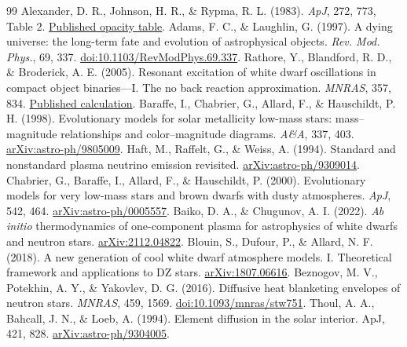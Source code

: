 \documentclass[11pt,letterpaper]{article}
\begin{document}
\begin{thebibliography}{99}
 Alexander, D. R., Johnson, H. R., \& Rypma, R. L. (1983).
\emph{ApJ}, 272, 773, Table 2.
\href{https://adsabs.harvard.edu/pdf/1983ApJ...272..773A}{Published opacity table}.
 Adams, F. C., \& Laughlin, G. (1997).
A dying universe: the long-term fate and evolution of astrophysical objects.
\emph{Rev. Mod. Phys.}, 69, 337.
\href{https://doi.org/10.1103/RevModPhys.69.337}{doi:10.1103/RevModPhys.69.337}.
 Rathore, Y., Blandford, R. D., \& Broderick, A. E. (2005).
Resonant excitation of white dwarf oscillations in compact object binaries---I.
The no back reaction approximation.
\emph{MNRAS}, 357, 834.
\href{https://academic.oup.com/mnras/article/357/3/834/1077414}{Published calculation}.
 Baraffe, I., Chabrier, G., Allard, F., \& Hauschildt, P. H. (1998).
Evolutionary models for solar metallicity low-mass stars: mass--magnitude
relationships and color--magnitude diagrams. \emph{A\&A}, 337, 403.
\href{https://arxiv.org/abs/astro-ph/9805009}{arXiv:astro-ph/9805009}.
 Haft, M., Raffelt, G., \& Weiss, A. (1994).
Standard and nonstandard plasma neutrino emission revisited.
\href{https://arxiv.org/abs/astro-ph/9309014}{arXiv:astro-ph/9309014}.
 Chabrier, G., Baraffe, I., Allard, F., \& Hauschildt, P. (2000).
Evolutionary models for very low-mass stars and brown dwarfs with dusty atmospheres.
\emph{ApJ}, 542, 464.
\href{https://arxiv.org/abs/astro-ph/0005557}{arXiv:astro-ph/0005557}.
 Baiko, D. A., \& Chugunov, A. I. (2022).
\emph{Ab initio} thermodynamics of one-component plasma for astrophysics of
white dwarfs and neutron stars.
\href{https://arxiv.org/abs/2112.04822}{arXiv:2112.04822}.
 Blouin, S., Dufour, P., \& Allard, N. F. (2018).
A new generation of cool white dwarf atmosphere models. I. Theoretical framework
and applications to DZ stars.
\href{https://arxiv.org/abs/1807.06616}{arXiv:1807.06616}.
 Beznogov, M. V., Potekhin, A. Y., \& Yakovlev, D. G. (2016).
Diffusive heat blanketing envelopes of neutron stars.
\emph{MNRAS}, 459, 1569.
\href{https://doi.org/10.1093/mnras/stw751}{doi:10.1093/mnras/stw751}.
 Thoul, A. A., Bahcall, J. N., \& Loeb, A. (1994).
Element diffusion in the solar interior. ApJ, 421, 828.
\href{https://arxiv.org/abs/astro-ph/9304005}{arXiv:astro-ph/9304005}.


\end{thebibliography}
\end{document}
